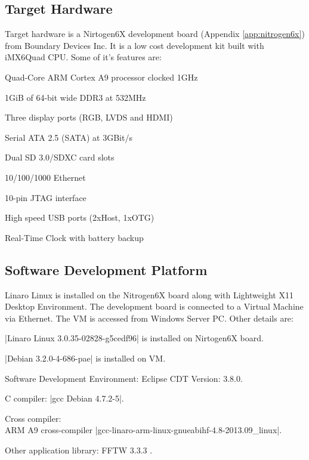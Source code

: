 \subsection{Target Hardware}
\label{ss:bg_related_work:hw}
Target hardware is a Nirtogen6X development board (Appendix \ref{app:nitrogen6x}) from Boundary Devices Inc. It is a low cost development kit built with iMX6Quad CPU. Some of it's features are:
\begin{compactitem} 
	\item Quad-Core ARM Cortex A9 processor clocked 1GHz
	\item 1GiB of 64-bit wide DDR3 at 532MHz
	\item Three display ports (RGB, LVDS and HDMI)
	\item Serial ATA 2.5 (SATA) at 3GBit/s
	\item Dual SD 3.0/SDXC card slots
	\item 10/100/1000 Ethernet
	\item 10-pin JTAG interface
	\item High speed USB ports (2xHost, 1xOTG)
	\item Real-Time Clock with battery backup
\end{compactitem}

\subsection{Software Development Platform}
\label{ss:bg_related_work:sw}
Linaro Linux is installed on the Nitrogen6X board along with Lightweight X11 Desktop Environment. The development board is connected to a Virtual Machine via Ethernet. The VM is accessed from Windows Server PC. Other details are:

\begin{compactitem} 
	\item \bverb|Linaro Linux 3.0.35-02828-g5cedf96| is installed on Nirtogen6X board.
	\item \bverb|Debian 3.2.0-4-686-pae| is installed on VM.
	\item Software Development Environment: Eclipse CDT Version: 3.8.0.
	\item C compiler: \bverb|gcc Debian 4.7.2-5|.
	\item Cross compiler: \\ARM A9 cross-compiler \bverb|gcc-linaro-arm-linux-gnueabihf-4.8-2013.09_linux|.
	\item Other application library: FFTW 3.3.3 \cite{fftw}. \\
\end{compactitem} 

